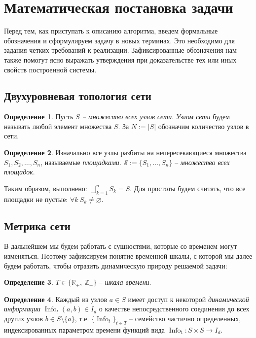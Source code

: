 \documentclass{article}
\theoremstyle{plain}
\theoremstyle{plain}
\theoremstyle{plain}
\theoremstyle{plain}
\theoremstyle{definition}
\newtheorem{definition}{Определение}[section]
\theoremstyle{remark}
\theoremstyle{plain}
\DeclareMathOperator*{\info}{Info}
\begin{document}
\section{Математическая постановка задачи}

Перед тем, как приступать к описанию алгоритма, введем формальные обозначения и сформулируем задачу в новых терминах. Это необходимо для задания четких требований к реализации. Зафиксированные обозначения нам также помогут ясно выражать утверждения при доказательстве тех или иных свойств построенной системы.

\subsection{Двухуровневая топология сети}

\begin{definition}
    Пусть \textit{$S$ – множество всех узлов сети}. \textit{Узлом сети} будем называть любой элемент множества $S$. За $N := |S|$ обозначим количество узлов в сети.
\end{definition}

\begin{definition}
    Изначально все узлы разбиты на непересекающиеся множества $S_1, S_2, \ldots, S_n$, называемые \textit{площадками}. $\mathcal{S} := \{S_1, \ldots, S_n\}$ -- \textit{множество всех площадок}.
\end{definition}

Таким образом, выполнено: $\displaystyle \bigsqcup_{k = 1}^n S_k = S$. Для простоты будем считать, что все площадки не пустые: $\forall k\ S_k \neq \varnothing$.

\subsection{Метрика сети}
\label{MetricSubsection}

В дальнейшем мы будем работать с сущностями, которые со временем могут изменяться. Поэтому зафиксируем понятие временной шкалы, с которой мы далее будем работать, чтобы отразить динамическую природу решаемой задачи:

\begin{definition}
    $T \in \{\mathbb{R}_+,\ \mathbb{Z}_+\}$ -- \textit{шкала времени}.
\end{definition}

\begin{definition}
    Каждый из узлов $a \in S$ имеет доступ к некоторой \textit{динамической информации} $\info_t(a, b) \in I_d$ о качестве непосредственного соединения до всех других узлов $b \in S \setminus \{a\}$, т.е. $\{\info_t\}_{t \in T}$ -- семейство частично определенных, индексированных параметром времени функций вида $\info_t: S \times S \to I_d$.
\end{definition}
\end{document}
